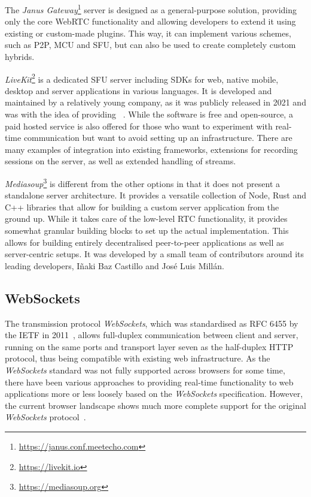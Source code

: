 

The \emph{Janus Gateway}\footnote{\url{https://janus.conf.meetecho.com}} server is designed as a general-purpose solution, providing only the core \ac{WebRTC} functionality and allowing developers to extend it using existing or custom-made plugins.
This way, it can implement various schemes, such as \ac{P2P}, \ac{MCU} and \ac{SFU}, but can also be used to create completely custom hybrids.

\emph{LiveKit}\footnote{\url{https://livekit.io}} is a dedicated \ac{SFU} server including \ac{SDK}s for web, native mobile, desktop and server applications in various languages.
It is developed and maintained by a relatively young company, as it was publicly released in 2021 and was  with the idea of providing ~\parencite{livekitAbout}.
While the software is free and open-source, a paid hosted service is also offered for those who want to experiment with real-time communication but want to avoid setting up an infrastructure.
There are many examples of integration into existing frameworks, extensions for recording sessions on the server, as well as extended handling of streams.

\emph{Mediasoup}\footnote{\url{https://mediasoup.org}} is different from the other options in that it does not present a standalone server architecture.
It provides a versatile collection of Node, Rust and C++ libraries that allow for building a custom server application from the ground up.
While it takes care of the low-level \ac{RTC} functionality, it provides somewhat granular building blocks to set up the actual implementation.
This allows for building entirely decentralised peer-to-peer applications as well as server-centric setups.
It was developed by a small team of contributors around its leading developers, Iñaki Baz Castillo and José Luis Millán.

\subsection{WebSockets}

The transmission protocol \emph{WebSockets}, which was standardised as \ac{RFC} 6455 by the \ac{IETF} in 2011~\parencite{webSocketsProtocolRfc}, allows full-duplex communication between client and server, running on the same ports and transport layer seven as the half-duplex \ac{HTTP} protocol, thus being compatible with existing web infrastructure.
As the \emph{WebSockets} standard was not fully supported across browsers for some time, there have been various approaches to providing real-time functionality to web applications more or less loosely based on the \emph{WebSockets} specification.
However, the current browser landscape shows much more complete support for the original \emph{WebSockets} protocol~\parencite{canIUseWebSockets}.

